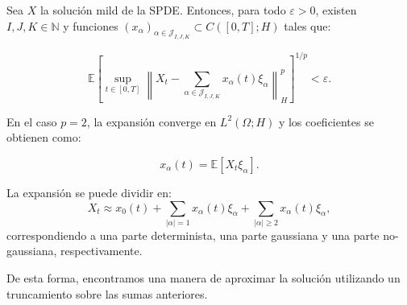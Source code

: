 \begin{teo}
  Sea $X$ la solución mild de la SPDE. Entonces, para todo $\varepsilon > 0$, existen $I, J, K \in \mathbb{N}$ y funciones $\left(x_\alpha\right)_{\alpha \in \mathcal{J}_{I,J,K}} \subset C([0,T]; H)$ tales que:

  \[
    \mathbb{E} \left[ \sup_{t \in [0,T]} \left\| X_t - \sum_{\alpha \in \mathcal{J}_{I,J,K}} x_\alpha(t) \xi_\alpha \right\|_H^p \right]^{1/p} < \varepsilon.
  \]

\end{teo}

En el caso $p = 2$, la expansión converge en $L^2(\Omega; H)$ y los coeficientes se obtienen como:

\[
  x_\alpha(t) = \mathbb{E}[X_t \xi_\alpha].
\]

La expansión se puede dividir en:
\[
  X_t \approx x_0(t) + \sum_{|\alpha| = 1} x_\alpha(t) \xi_\alpha + \sum_{|\alpha| \geq 2} x_\alpha(t) \xi_\alpha,
\]
correspondiendo a una parte determinista, una parte gaussiana y una parte no-gaussiana, respectivamente.

De esta forma, encontramos una manera de aproximar la solución utilizando un truncamiento sobre las sumas anteriores.
